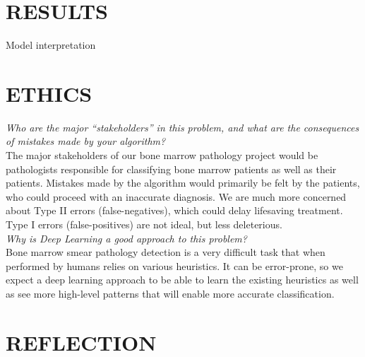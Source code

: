 \documentclass[%
 reprint,
 amsmath,amssymb,
 aps,
]{revtex4-1}
\begin{document}

\section{\label{sec:level1}RESULTS}
Model interpretation \\






\section{\label{sec:level1}ETHICS}

\textit{Who are the major “stakeholders” in this problem, and what are the consequences of mistakes made by your algorithm?} \\

The major stakeholders of our bone marrow pathology project would be pathologists responsible for classifying bone marrow patients as well as their patients. Mistakes made by the algorithm would primarily be felt by the patients, who could proceed with an inaccurate diagnosis. We are much more concerned about Type II errors (false-negatives), which could delay lifesaving treatment. Type I errors (false-positives) are not ideal, but less deleterious. \\

\textit{Why is Deep Learning a good approach to this problem?} \\

Bone marrow smear pathology detection is a very difficult task that when performed by humans relies on various heuristics. It can be error-prone, so we expect a deep learning approach to be able to learn the existing heuristics as well as see more high-level patterns that will enable more accurate classification. \\





\section{\label{sec:level1}REFLECTION}
\end{document}
